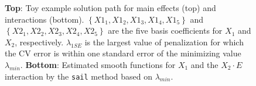 \documentclass[a4paper,fleqn]{cas-sc}
\begin{document}
\begin{figure}[h]
	\centering
	\quad	
	\caption{\textbf{Top}: Toy example solution path for main effects (top) and interactions (bottom). $\left\lbrace X1_1, X1_2, X1_3, X1_4, X1_5 \right\rbrace$ and $\left\lbrace X2_1, X2_2, X2_3, X2_4, X2_5 \right\rbrace$ are the five basis coefficients for $X_1$ and $X_2$, respectively. $\lambda_{1SE}$ is the largest value of penalization for which the CV error is within one standard error of the minimizing value $\lambda_{min}$. \textbf{Bottom}: Estimated smooth functions for $X_1$ and the $X_2 \cdot E$ interaction by the \texttt{sail} method based on $\lambda_{min}$.}
	\label{fig:toy-effects}
\end{figure}

\FloatBarrier
\end{document}
